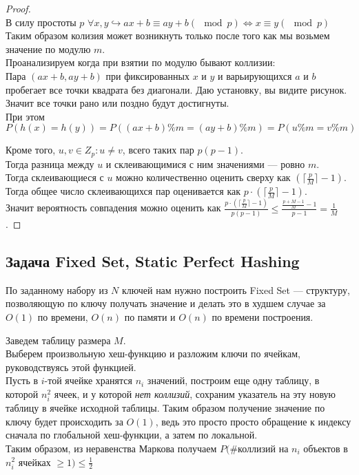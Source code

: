 \begin{proof} \ \\
    В силу простоты $p$ $\forall x, y \hookrightarrow ax + b \equiv ay + b (\mod p) \iff x \equiv y (\mod p)$\\
    Таким образом колизия может возникнуть только после того как мы возьмем значение по модулю $m$. \\

    Проанализируем когда при взятии по модулю бывают коллизии: \\ 
    Пара $(ax + b, ay + b)$ при фиксированных  $x$ и  $y$ и варьирующихся $a$ и  $b$ пробегает все точки квадрата без диагонали.
    Даю установку, вы видите рисунок.
    Значит все точки рано или поздно будут достигнуты. \\
    При этом $P(h(x) = h(y)) = P((ax + b) \% m = (ay + b) \% m) = P(u \% m = v \% m)$

    Кроме того, $u, v \in Z_p: u \neq v$, всего таких пар $p(p - 1)$. \\
    Тогда разница между  $u$  и склеивающимися с ним значениями --- ровно $m$. \\
    Тогда склеивающиеся с $u$  можно количественно оценить сверху как $(\lceil \frac{p}{M} \rceil - 1) $. \\
    Тогда общее число склеивающихся пар оценивается как $p \cdot (\lceil \frac{p}{M} \rceil - 1)$. \\
    Значит вероятность совпадения можно оценить как $\frac{p \cdot (\lceil \frac{p}{M} \rceil - 1)}{p(p - 1)}  \leq \frac{\frac{p + M - 1}{M} - 1}{p - 1} = \frac{1}{M}$.
\end{proof}

\subsection{Задача Fixed Set, Static Perfect Hashing}
По заданному набору из $N$ ключей нам нужно построить Fixed Set --- структуру, 
позволяющую по ключу получать значение и делать это в худшем случае за $O(1)$ по времени, $O(n)$ по памяти и  $O(n)$ по времени построения.

Заведем таблицу размера $M$. \\
Выберем произвольную хеш-функцию и разложим ключи по ячейкам, руководствуясь этой функцией. \\
Пусть в $i$-той ячейке хранятся  $n_i$ значений, построим еще одну таблицу, в которой  $n_i ^ 2$ ячеек, и у которой \textit{нет коллизий},
сохраним указатель на эту новую таблицу в ячейке исходной таблицы. Таким образом получение значение по ключу будет происходить за $O(1)$, 
ведь это просто просто обращение к индексу сначала по глобальной хеш-функции, а затем по локальной. \\
Таким образом, из неравенства Маркова получаем $P($\#коллизий на $n_i$ объектов в  $n_i ^ 2$ ячейках $\geq 1) \leq \frac{1}{2}$  

